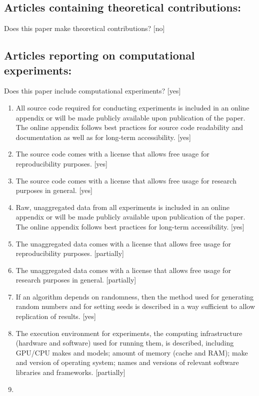 \documentclass[manuscript, screen, review]{jair}
\begin{document}
\subsection*{Articles containing theoretical contributions:}
Does this paper make theoretical contributions?
[no]

\subsection*{Articles reporting on computational experiments:}
Does this paper include computational experiments? [yes]

\begin{enumerate}
    \item
    All source code required for conducting experiments is included in an online appendix
    or will be made publicly available upon publication of the paper.
    The online appendix follows best practices for source code readability and documentation as well as for long-term accessibility.
    [yes]
    \item The source code comes with a license that
    allows free usage for reproducibility purposes.
    [yes]
    \item The source code comes with a license that
    allows free usage for research purposes in general.
    [yes]
    \item
    Raw, unaggregated data from all experiments is included in an online appendix
    or will be made publicly available upon publication of the paper.
    The online appendix follows best practices for long-term accessibility.
    [yes]
    \item The unaggregated data comes with a license that
    allows free usage for reproducibility purposes.
    [partially]
    \item The unaggregated data comes with a license that
    allows free usage for research purposes in general.
    [partially]
    \item If an algorithm depends on randomness, then the method used for generating random numbers and for setting seeds is described in a way sufficient to allow replication of results.
    [yes]
    \item The execution environment for experiments, the computing infrastructure (hardware and software) used for running them, is described, including GPU/CPU makes and models; amount of memory (cache and RAM); make and version of operating system; names and versions of relevant software libraries and frameworks.
    [partially]
    \item

\end{enumerate}
\end{document}
